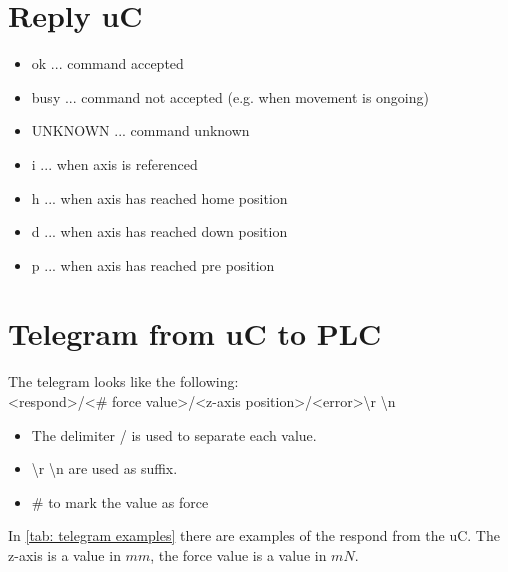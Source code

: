 \documentclass[a4paper,12pt]{scrreprt}
\begin{document}
\section{Reply \acs{uC}}
 
 \begin{itemize}
\item \acs{ok} ... command accepted
\item \acs{busy} ... command not accepted (e.g. when movement is ongoing)
\item \acs{UNKNOWN} ... command unknown
\item \acs{i} ... when axis is referenced
\item \acs{h} ... when axis has reached home position
\item \acs{d} ... when axis has reached down position
\item \acs{p} ... when axis has reached pre position
\end{itemize}

\section{Telegram from \ac{uC} to \ac{PLC}}
The telegram looks like the following:\\
<respond>/<$\#$ force value>/<z-axis position>/<error>\textbackslash r \textbackslash n
\begin{itemize}
\item The delimiter / is used to separate each value.
\item \textbackslash r \textbackslash n are used as suffix.
\item $\#$ to mark the value as force
\end{itemize}

In \autoref{tab: telegram examples} there are examples of the respond from the \acs{uC}. The z-axis is a value in $mm$, the force value is a value in $mN$.
\end{document}
